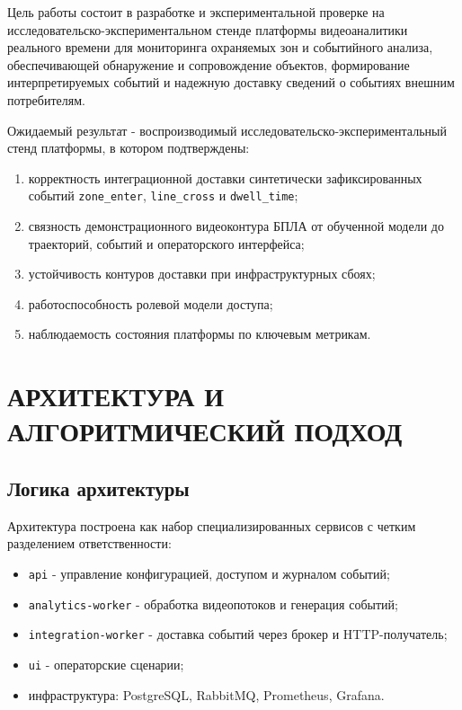 Цель работы состоит в разработке и экспериментальной проверке на исследовательско-экспериментальном стенде платформы видеоаналитики реального времени для мониторинга охраняемых зон и событийного анализа, обеспечивающей обнаружение и сопровождение объектов, формирование интерпретируемых событий и надежную доставку сведений о событиях внешним потребителям.

Ожидаемый результат - воспроизводимый исследовательско-экспериментальный стенд платформы, в котором подтверждены:
\begin{enumerate}
    \item корректность интеграционной доставки синтетически зафиксированных событий \texttt{zone\_enter}, \texttt{line\_cross} и \texttt{dwell\_time};
    \item связность демонстрационного видеоконтура БПЛА от обученной модели до траекторий, событий и операторского интерфейса;
    \item устойчивость контуров доставки при инфраструктурных сбоях;
    \item работоспособность ролевой модели доступа;
    \item наблюдаемость состояния платформы по ключевым метрикам.
\end{enumerate}

\chapter{АРХИТЕКТУРА И АЛГОРИТМИЧЕСКИЙ ПОДХОД}
\label{ch:short_arch}

\section{Логика архитектуры}

Архитектура построена как набор специализированных сервисов с четким разделением ответственности:
\begin{itemize}
    \item \texttt{api} - управление конфигурацией, доступом и журналом событий;
    \item \texttt{analytics-worker} - обработка видеопотоков и генерация событий;
    \item \texttt{integration-worker} - доставка событий через брокер и HTTP-получатель;
    \item \texttt{ui} - операторские сценарии;
    \item инфраструктура: PostgreSQL, RabbitMQ, Prometheus, Grafana.
\end{itemize}


